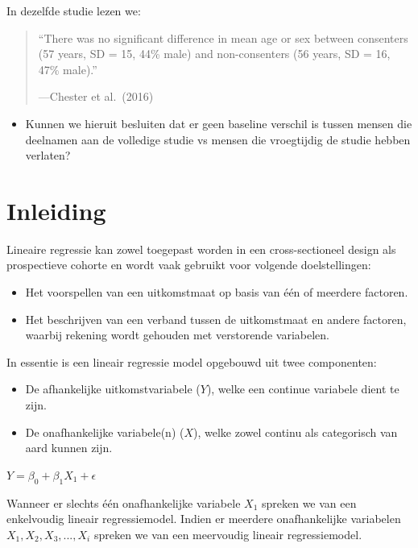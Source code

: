 \documentclass[
]{book}
\providecommand{\tightlist}{%
  \setlength{\itemsep}{0pt}\setlength{\parskip}{0pt}}
\theoremstyle{definition}
\theoremstyle{definition}
\theoremstyle{definition}
\theoremstyle{definition}
\theoremstyle{remark}
\begin{document}
In dezelfde studie lezen we:

\begin{quote}
``There was no significant difference in mean age or sex between consenters (57 years, SD = 15, 44\% male) and non-consenters (56 years, SD = 16, 47\% male).''

---Chester et al.~(2016)
\end{quote}

\begin{itemize}
\tightlist
\item
  Kunnen we hieruit besluiten dat er geen baseline verschil is tussen mensen die deelnamen aan de volledige studie vs mensen die vroegtijdig de studie hebben verlaten?
\end{itemize}

\hypertarget{inleiding-1}{%
\section*{Inleiding}\label{inleiding-1}}


Lineaire regressie kan zowel toegepast worden in een cross-sectioneel design als prospectieve cohorte en wordt vaak gebruikt voor volgende doelstellingen:

\begin{itemize}
\tightlist
\item
  Het voorspellen van een uitkomstmaat op basis van één of meerdere factoren.
\item
  Het beschrijven van een verband tussen de uitkomstmaat en andere factoren, waarbij rekening wordt gehouden met verstorende variabelen.
\end{itemize}

In essentie is een lineair regressie model opgebouwd uit twee componenten:

\begin{itemize}
\tightlist
\item
  De afhankelijke uitkomstvariabele (\(Y\)), welke een continue variabele dient te zijn.
\item
  De onafhankelijke variabele(n) (\(X\)), welke zowel continu als categorisch van aard kunnen zijn.
\end{itemize}

\(Y = \beta_0 + \beta_1 X_1 + \epsilon\)

Wanneer er slechts één onafhankelijke variabele \(X_1\) spreken we van een enkelvoudig lineair regressiemodel. Indien er meerdere onafhankelijke variabelen \(X_1, X_2, X_3,..., X_i\) spreken we van een meervoudig lineair regressiemodel.
\end{document}
